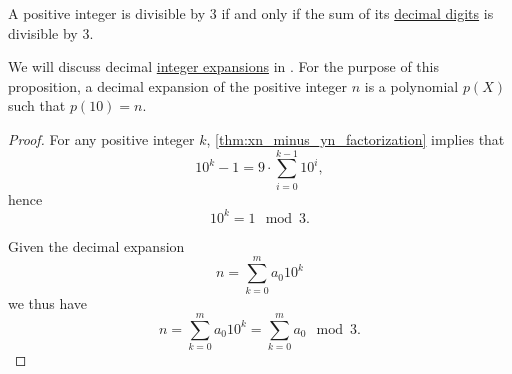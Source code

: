 \begin{proposition}\label{thm:division_by_three_digits}
  A positive integer is divisible by \( 3 \) if and only if the sum of its \hyperref[def:positional_number_system/decimal]{decimal digits} is divisible by \( 3 \).
\end{proposition}
\begin{comments}
  \item We will discuss decimal \hyperref[def:integer_radix_expansion]{integer expansions} in . For the purpose of this proposition, a decimal expansion of the positive integer \( n \) is a polynomial \( p(X) \) such that \( p(10) = n \).
\end{comments}
\begin{proof}
  For any positive integer \( k \), \cref{thm:xn_minus_yn_factorization} implies that
  \begin{equation*}
    10^k - 1 = 9 \cdot \sum_{i=0}^{k-1} 10^i,
  \end{equation*}
  hence
  \begin{equation*}
    10^k = 1 \mod 3.
  \end{equation*}

  Given the decimal expansion
  \begin{equation*}
    n = \sum_{k=0}^m a_0 10^k
  \end{equation*}
  we thus have
  \begin{equation*}
    n = \sum_{k=0}^m a_0 10^k = \sum_{k=0}^m a_0 \mod 3.
  \end{equation*}
\end{proof}

